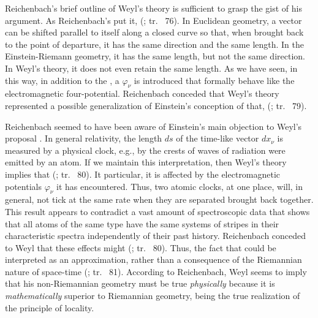 \documentclass[final]{article}
\newcommand{\phin}{\ensuremath{\varphi_\nu}\xspace}
\newcommand{\WT}{Weyl's theory\xspace}
\newcommand{\rhp}[2]{(\cite[#1]{Reichenbach1920a}; tr.\ \citeyear{Reichenbach1969} #2)\xspace}
\begin{document}
Reichenbach's brief outline of \WT is sufficient to grasp the gist of his argument. As Reichenbach's put it,  \rhp{73}{76}. In Euclidean geometry, a vector can be shifted parallel to itself along a closed curve so that, when brought back to the point of departure, it has the same direction and the same length. In the Einstein-Riemann geometry, it has the same length, but not the same direction. In \WT, it does not even retain the same length. As we have seen, in this way, in addition to the  \gmn, a  $\phin$ is introduced that formally behave like the electromagnetic four-potential. Reichenbach conceded that \WT represented a possible generalization of Einstein's conception of \spti that,  \rhp{76}{79}. 

Reichenbach seemed to have been aware of Einstein's main objection to Weyl's proposal \citep[see][]{Einstein1918b}. In general relativity, the length $ds$ of the time-like vector $dx_\nu$ is measured by a physical clock, e.g., by the crests of waves of radiation were emitted by an atom. If we maintain this interpretation, then \WT implies that  \rhp{77}{80}. It particular, it is affected by the electromagnetic potentials $\varphi_\nu$ it has encountered. Thus, two atomic clocks, at one place, will, in general, not tick at the same rate when they are separated brought back together. This result appears to contradict a vast amount of spectroscopic data that shows that all atoms of the same type have the same systems of stripes in their characteristic spectra independently of their past history. Reichenbach conceded to Weyl that these effects might  \rhp{77}{80}. Thus, the fact that  could be interpreted as an approximation, rather than a consequence of the Riemannian nature of space-time \rhp{77}{81}. According to Reichenbach, Weyl seems to imply that his non-Riemannian geometry must be true \emph{physically} because it is \emph{mathematically} superior to Riemannian geometry, being the true realization of the principle of locality. 
\end{document}
